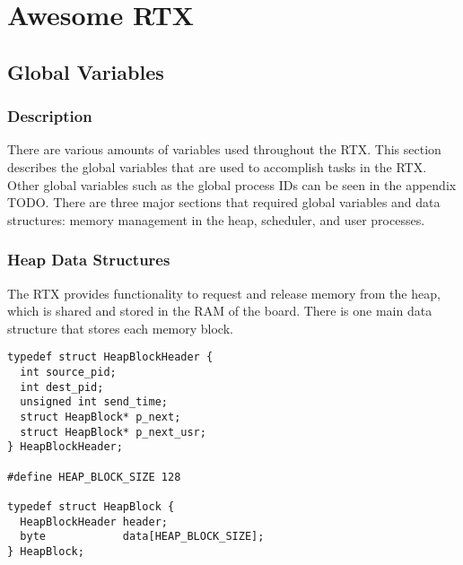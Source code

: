 \documentclass[12pt]{report}
\begin{document}
\part{Awesome RTX}

\chapter{Global Variables}
\section{Description}
There are various amounts of variables used throughout the RTX. This section describes the global variables that are used to accomplish tasks in the RTX. Other global variables such as the global process IDs can be seen in the appendix TODO. There are three major sections that required global variables and data structures: memory management in the heap, scheduler, and user processes.

\section{Heap Data Structures}
The RTX provides functionality to request and release memory from the heap, which is shared and stored in the RAM of the board. There is one main data structure that stores each memory block.

\begin{lstlisting}
typedef struct HeapBlockHeader {
  int source_pid;
  int dest_pid;
  unsigned int send_time;
  struct HeapBlock* p_next;
  struct HeapBlock* p_next_usr;
} HeapBlockHeader;

#define HEAP_BLOCK_SIZE 128

typedef struct HeapBlock {
  HeapBlockHeader header;
  byte            data[HEAP_BLOCK_SIZE];
} HeapBlock;

\end{lstlisting}
\end{document}
